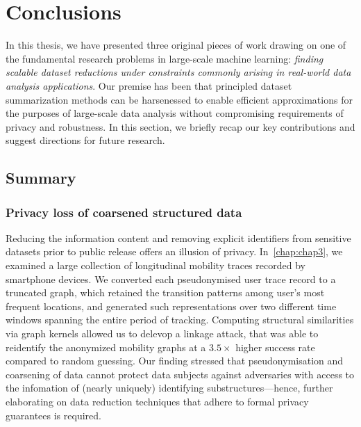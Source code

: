 \chapter{Conclusions}
\label{chap:chap6}
\renewcommand*{\MyPath}{../Chapter6}%

In this thesis, we have presented three original pieces of work drawing on one of the fundamental research problems in large-scale machine learning: \emph{finding scalable dataset reductions under constraints commonly arising in real-world data analysis applications}. Our premise has been that principled dataset summarization methods can be harsenessed to enable efficient approximations for the purposes of large-scale data analysis without compromising requirements of privacy and robustness. In this section, we briefly recap our key contributions and suggest directions for future research.

\section{Summary}
\label{sec:summary}


\subsection{Privacy loss of coarsened structured data}
\label{subsec:ch3-summary}
Reducing the information content and removing explicit identifiers from sensitive datasets prior to public release offers an illusion of privacy. In~\cref{chap:chap3}, we examined a large collection of longitudinal mobility traces recorded by smartphone devices. We converted each pseudonymised user trace record to a truncated graph, which retained the transition patterns among user's most frequent locations, and generated such representations over two different time windows spanning the entire period of tracking. Computing structural similarities via graph kernels allowed us to delevop a linkage attack, that was able to reidentify the anonymized mobility graphs at a $3.5\times$ higher success rate compared to random guessing. Our finding stressed that pseudonymisation and coarsening of data cannot protect data subjects against adversaries with access to the infomation of (nearly uniquely) identifying substructures---hence, further elaborating on data reduction techniques that adhere to formal privacy guarantees is required.

